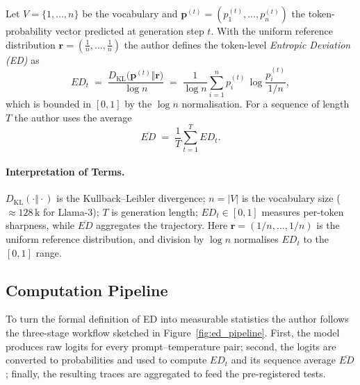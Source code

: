\documentclass[12pt]{article}
\begin{document}
Let $V=\{1,\dots,n\}$ be the vocabulary and
$\mathbf p^{(t)}=(p_{1}^{(t)},\dots,p_{n}^{(t)})$ the token-probability
vector predicted at generation step $t$.
With the uniform reference distribution
$\mathbf r=(\tfrac1n,\dots,\tfrac1n)$ the author defines the token-level
\emph{Entropic Deviation (ED)} as
\begin{equation}
  ED_t \;=\;
  \frac{D_{\mathrm{KL}}\!\bigl(\mathbf p^{(t)}\Vert\mathbf r\bigr)}
       {\log n}
  \;=\;
  \frac{1}{\log n}\sum_{i=1}^{n}
      p_{i}^{(t)}\,
      \log\frac{p_{i}^{(t)}}{1/n},
  \label{eq:ed_token}
\end{equation}
which is bounded in $[0,1]$ by the $\log n$ normalisation.
For a sequence of length $T$ the author uses the average
\begin{equation}
  \overline{ED}
  \;=\;
  \frac1T\sum_{t=1}^{T} ED_t .
  \label{eq:ed_seq}
\end{equation}

\paragraph{Interpretation of Terms.}
$D_{\mathrm{KL}}(\cdot\Vert\cdot)$ is the Kullback--Leibler divergence;
$n=|V|$ is the vocabulary size ($\approx\!128\,\mathrm{k}$ for Llama-3);
$T$ is generation length; $ED_t\in[0,1]$ measures per-token sharpness,
while $\overline{ED}$ aggregates the trajectory.
Here $\mathbf r=(1/n,\dots,1/n)$ is the uniform reference distribution,
and division by $\log n$ normalises $ED_t$ to the $[0,1]$ range.

\subsection{Computation Pipeline}

To turn the formal definition of ED into measurable statistics the author follows
the three-stage workflow sketched in Figure~\ref{fig:ed_pipeline}.  
First, the model produces raw logits for every prompt–temperature pair;  
second, the logits are converted to probabilities and used to compute
$ED_t$ and its sequence average $\overline{ED}$;  
finally, the resulting traces are aggregated to feed the pre-registered tests.
\end{document}
